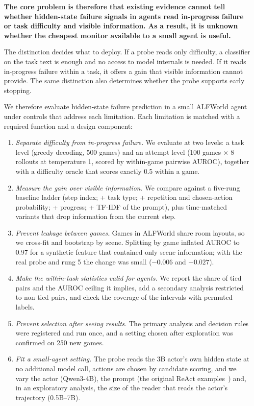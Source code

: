 \documentclass[11pt]{article}
\begin{document}
\textbf{The core problem is therefore that existing evidence cannot tell whether hidden-state failure signals in agents read in-progress failure or task difficulty and visible information. As a result, it is unknown whether the cheapest monitor available to a small agent is useful.}

The distinction decides what to deploy. If a probe reads only difficulty, a classifier on the task text is enough and no access to model internals is needed. If it reads in-progress failure within a task, it offers a gain that visible information cannot provide.
The same distinction also determines whether the probe supports early stopping.

We therefore evaluate hidden-state failure prediction in a small ALFWorld agent~\cite{shridhar2021alfworld} under controls that address each limitation. Each limitation is matched with a required function and a design component:
\begin{enumerate}
\item \emph{Separate difficulty from in-progress failure.} We evaluate at two levels: a task level (greedy decoding, 500 games) and an attempt level (100 games $\times$ 8 rollouts at temperature 1, scored by within-game pairwise AUROC), together with a difficulty oracle that scores exactly 0.5 within a game.
\item \emph{Measure the gain over visible information.} We compare against a five-rung baseline ladder (step index; + task type; + repetition and chosen-action probability; + progress; + TF-IDF of the prompt), plus time-matched variants that drop information from the current step.
\item \emph{Prevent leakage between games.} Games in ALFWorld share room layouts, so we cross-fit and bootstrap by scene. Splitting by game inflated AUROC to 0.97 for a synthetic feature that contained only scene information; with the real probe and rung 5 the change was small ($-0.006$ and $-0.027$).
\item \emph{Make the within-task statistics valid for agents.} We report the share of tied pairs and the AUROC ceiling it implies, add a secondary analysis restricted to non-tied pairs, and check the coverage of the intervals with permuted labels.
\item \emph{Prevent selection after seeing results.} The primary analysis and decision rules were registered and run once, and a setting chosen after exploration was confirmed on 250 new games.
\item \emph{Fit a small-agent setting.} The probe reads the 3B actor's own hidden state at no additional model call, actions are chosen by candidate scoring, and we vary the actor (Qwen3-4B), the prompt (the original ReAct examples~\cite{yao2023react}) and, in an exploratory analysis, the size of the reader that reads the actor's trajectory (0.5B--7B).
\end{enumerate}
\end{document}
